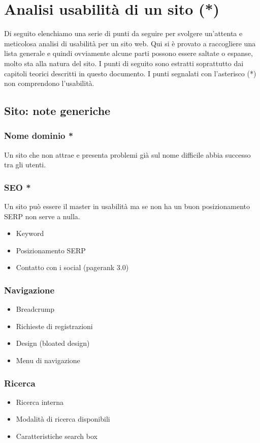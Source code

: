 
\chapter{Analisi usabilità di un sito (*)}
	Di seguito elenchiamo una serie di punti da seguire per svolgere un'attenta e meticolosa analisi di usabilità per un sito web. Qui si  è provato a raccogliere una lista generale e quindi ovviamente alcune parti possono essere saltate o espanse, molto sta alla natura del sito.
	I punti di seguito sono estratti soprattutto dai capitoli teorici descritti in questo documento. I punti segnalati con l'asterisco (*) non comprendono l'usabilità.
	
	\section{Sito: note generiche}

			\subsection*{Nome dominio *} 
				Un sito che non attrae e presenta problemi già sul nome difficile abbia successo tra gli utenti.
				
			\subsection*{SEO *} 
				Un sito può essere il master in usabilità ma se non ha un buon posizionamento SERP non serve a nulla.
				\begin{itemize}
					\item Keyword
					\item Posizionamento SERP
					\item Contatto con i social (pagerank 3.0)
				\end{itemize}
				
			\subsection*{Navigazione}
				\begin{itemize}
					\item Breadcrump
					\item Richieste di registrazioni
					\item Design (bloated design)
					\item Menu di navigazione
				\end{itemize}
			
			\subsection*{Ricerca}
				\begin{itemize}
					\item Ricerca interna
					\item Modalità di ricerca disponibili
					\item Caratteristiche search box
				\end{itemize}
			
